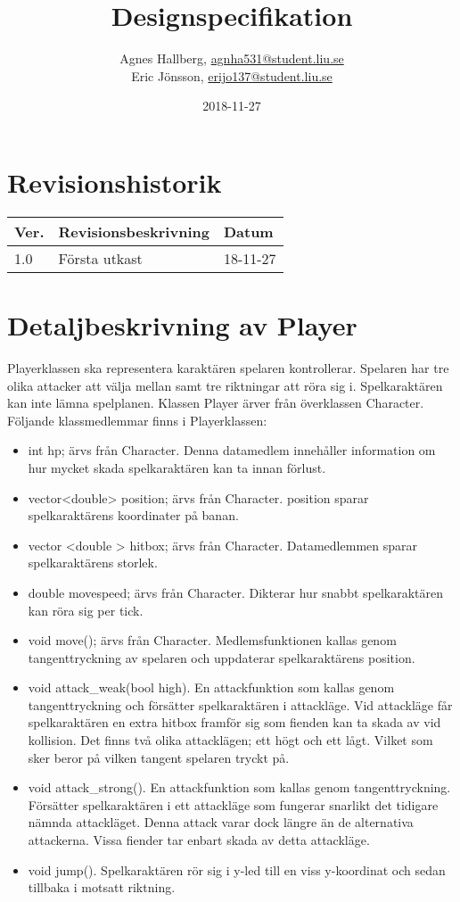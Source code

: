 \documentclass{TDP005mall}
\author{Agnes Hallberg, \url{agnha531@student.liu.se}\\
  Eric Jönsson, \url{erijo137@student.liu.se}}
\title{Designspecifikation}
\date{2018-11-27}
\begin{document}
\projectpage

\section*{Revisionshistorik}
\begin{table}[!h]
\begin{tabularx}{\linewidth}{|l|X|l|}
\hline
Ver. & Revisionsbeskrivning & Datum \\\hline
1.0 & Första utkast  & 18-11-27 \\\hline
\end{tabularx}
\end{table}

\section{Detaljbeskrivning av Player}
Playerklassen ska representera karaktären spelaren kontrollerar. Spelaren har tre olika attacker att välja mellan samt tre riktningar att röra sig i. Spelkaraktären kan inte lämna spelplanen. Klassen Player ärver från överklassen Character. Följande klassmedlemmar finns i Playerklassen:
\begin{itemize}
\item int hp; ärvs från Character. Denna datamedlem innehåller information om hur mycket skada spelkaraktären kan ta innan förlust.
\item vector<double> position; ärvs från Character. position sparar spelkaraktärens koordinater på banan.
\item vector <double > hitbox; ärvs från Character. Datamedlemmen sparar spelkaraktärens storlek.
\item double movespeed; ärvs från Character. Dikterar hur snabbt spelkaraktären kan röra sig per tick.
\item void move(); ärvs från Character. Medlemsfunktionen kallas genom tangenttryckning av spelaren och uppdaterar spelkaraktärens position.
\item void attack\_weak(bool high). En attackfunktion som kallas genom tangenttryckning och försätter spelkaraktären i attackläge. Vid attackläge får spelkaraktären en extra hitbox framför sig som fienden kan ta skada av vid kollision. Det finns två olika attacklägen; ett högt och ett lågt. Vilket som sker beror på vilken tangent spelaren tryckt på.
\item void attack\_strong(). En attackfunktion som kallas genom tangenttryckning. Försätter spelkaraktären i ett attackläge som fungerar snarlikt det tidigare nämnda attackläget. Denna attack varar dock längre än de alternativa attackerna. Vissa fiender tar enbart skada av detta attackläge.
\item void jump(). Spelkaraktären rör sig i y-led till en viss y-koordinat och sedan tillbaka i motsatt riktning.
\end{itemize}
\end{document}
